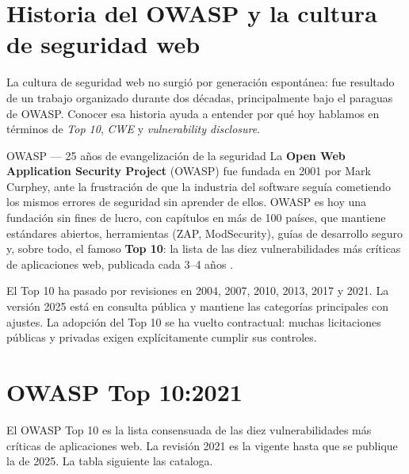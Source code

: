 \documentclass[11pt,a4paper,openany]{book}
\begin{document}
\section{Historia del OWASP y la cultura de seguridad web}

La cultura de seguridad web no surgió por generación
espontánea: fue resultado de un trabajo organizado durante dos
décadas, principalmente bajo el paraguas de OWASP. Conocer esa
historia ayuda a entender por qué hoy hablamos en términos de
\emph{Top 10}, \emph{CWE} y \emph{vulnerability disclosure}.


\begin{cajahistoria}{OWASP --- 25 años de evangelización de la seguridad}
La \textbf{Open Web Application Security Project} (OWASP) fue
fundada en 2001 por Mark Curphey, ante la frustración de que la
industria del software seguía cometiendo los mismos errores de
seguridad sin aprender de ellos. OWASP es hoy una fundación sin
fines de lucro, con capítulos en más de 100 países, que mantiene
estándares abiertos, herramientas (ZAP, ModSecurity), guías de
desarrollo seguro y, sobre todo, el famoso \textbf{Top 10}: la
lista de las diez vulnerabilidades más críticas de aplicaciones
web, publicada cada 3--4 años \cite{owasp2021top10}.

El Top 10 ha pasado por revisiones en 2004, 2007, 2010, 2013,
2017 y 2021. La versión 2025 está en consulta pública y mantiene
las categorías principales con ajustes. La adopción del Top 10 se
ha vuelto contractual: muchas licitaciones públicas y privadas
exigen explícitamente cumplir sus controles.
\end{cajahistoria}

\section{OWASP Top 10:2021 \cite{owasp2021top10}}

El OWASP Top 10 es la lista consensuada de las diez
vulnerabilidades más críticas de aplicaciones web. La revisión 2021
es la vigente hasta que se publique la de 2025. La tabla siguiente
las cataloga.
\end{document}
